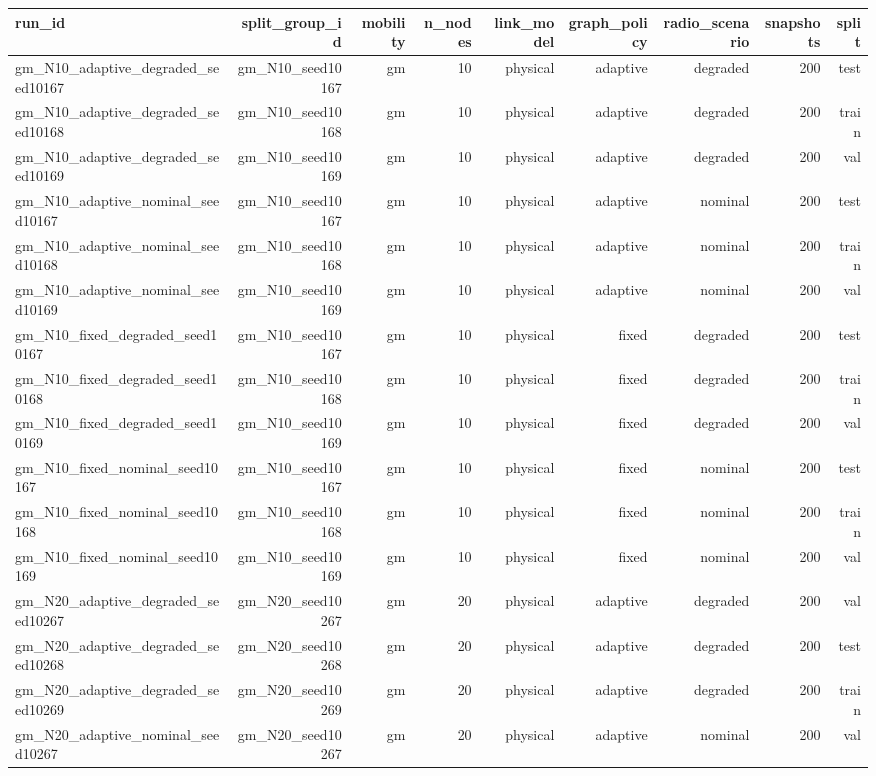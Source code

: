 \begin{tabular}{lrrrrrrrr}
\toprule
run\_id & split\_group\_id & mobility & n\_nodes & link\_model & graph\_policy & radio\_scenario & snapshots & split \\
\midrule
gm\_N10\_adaptive\_degraded\_seed10167 & gm\_N10\_seed10167 & gm & 10 & physical & adaptive & degraded & 200 & test \\
gm\_N10\_adaptive\_degraded\_seed10168 & gm\_N10\_seed10168 & gm & 10 & physical & adaptive & degraded & 200 & train \\
gm\_N10\_adaptive\_degraded\_seed10169 & gm\_N10\_seed10169 & gm & 10 & physical & adaptive & degraded & 200 & val \\
gm\_N10\_adaptive\_nominal\_seed10167 & gm\_N10\_seed10167 & gm & 10 & physical & adaptive & nominal & 200 & test \\
gm\_N10\_adaptive\_nominal\_seed10168 & gm\_N10\_seed10168 & gm & 10 & physical & adaptive & nominal & 200 & train \\
gm\_N10\_adaptive\_nominal\_seed10169 & gm\_N10\_seed10169 & gm & 10 & physical & adaptive & nominal & 200 & val \\
gm\_N10\_fixed\_degraded\_seed10167 & gm\_N10\_seed10167 & gm & 10 & physical & fixed & degraded & 200 & test \\
gm\_N10\_fixed\_degraded\_seed10168 & gm\_N10\_seed10168 & gm & 10 & physical & fixed & degraded & 200 & train \\
gm\_N10\_fixed\_degraded\_seed10169 & gm\_N10\_seed10169 & gm & 10 & physical & fixed & degraded & 200 & val \\
gm\_N10\_fixed\_nominal\_seed10167 & gm\_N10\_seed10167 & gm & 10 & physical & fixed & nominal & 200 & test \\
gm\_N10\_fixed\_nominal\_seed10168 & gm\_N10\_seed10168 & gm & 10 & physical & fixed & nominal & 200 & train \\
gm\_N10\_fixed\_nominal\_seed10169 & gm\_N10\_seed10169 & gm & 10 & physical & fixed & nominal & 200 & val \\
gm\_N20\_adaptive\_degraded\_seed10267 & gm\_N20\_seed10267 & gm & 20 & physical & adaptive & degraded & 200 & val \\
gm\_N20\_adaptive\_degraded\_seed10268 & gm\_N20\_seed10268 & gm & 20 & physical & adaptive & degraded & 200 & test \\
gm\_N20\_adaptive\_degraded\_seed10269 & gm\_N20\_seed10269 & gm & 20 & physical & adaptive & degraded & 200 & train \\
gm\_N20\_adaptive\_nominal\_seed10267 & gm\_N20\_seed10267 & gm & 20 & physical & adaptive & nominal & 200 & val \\

\end{tabular}
